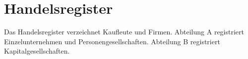 \section{Handelsregister}

Das Handelsregister verzeichnet Kaufleute und Firmen. Abteilung A registriert Einzelunternehmen und Personengesellschaften. Abteilung B registriert Kapitalgesellschaften.
